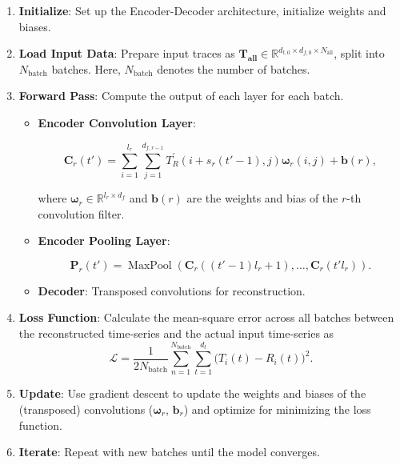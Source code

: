 \begin{enumerate}
    \item \textbf{Initialize}: Set up the Encoder-Decoder architecture, initialize weights and biases.
    \item \textbf{Load Input Data}: Prepare input traces as $\mathbf{T_{\text{all}}} \in \mathbb{R}^{ d_{t,0} \times d_{f,0} \times N_{\text{all}}}$, split into $N_{\text{batch}}$ batches. Here, $N_{\text{batch}}$ denotes the number of batches.
    \item \textbf{Forward Pass}: Compute the output of each layer for each batch.
    
    \begin{itemize}
        \item \textbf{Encoder Convolution Layer}:
        \begin{footnotesize}
        \begin{equation}
        \boldsymbol{C}_r(t') = \sum_{i=1}^{l_r} \sum_{j=1}^{d_{f, r-1}} T^{'}_R(i+s_r(t'-1), j) \boldsymbol{\omega}_r(i, j) + \boldsymbol{b}(r),
        \end{equation}
        \end{footnotesize}
        where $\boldsymbol{\omega}_r \in \mathbb{R}^{l_r \times d_f}$ and $\boldsymbol{b}(r)$ are the weights and bias of the $r$-th convolution filter.
        
        \item \textbf{Encoder Pooling Layer}:
        \begin{footnotesize}
        \begin{equation}
        \boldsymbol{P}_r(t') = \operatorname{MaxPool}\left(\boldsymbol{C}_r((t'-1)l_r+1), \ldots, \boldsymbol{C}_r(t' l_r)\right).
        \end{equation}
        \end{footnotesize}
        \item \textbf{Decoder}: Transposed convolutions for reconstruction.
    \end{itemize}
    \item \textbf{Loss Function}: Calculate the mean-square error across all batches between the reconstructed time-series and the actual input time-series as
    \begin{equation}
    \mathcal{L} = \frac{1}{2N_{\text{batch}}} \sum_{n=1}^{N_{\text{batch}}} \sum_{t=1}^{d_t} \Big(T_i(t) - R_i(t) \Big)^2.
    \end{equation}
    \item \textbf{Update}: Use gradient descent to update the weights and biases of the (transposed) convolutions ($\boldsymbol{\omega}_r$, $\boldsymbol{b}_r$) and optimize for minimizing the loss function.
    \item \textbf{Iterate}: Repeat with new batches until the model converges.
\end{enumerate}


